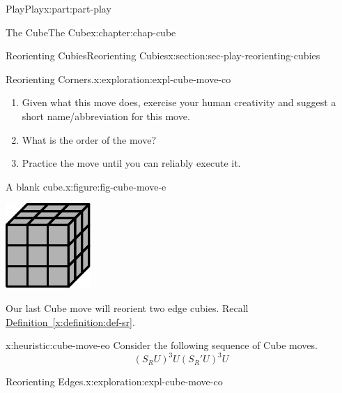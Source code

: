 \documentclass[oneside,10pt,]{book}
\newcommand{\xreffont}{\relax}
\numberwithin{equation}{section}
\begin{document}
\begin{partptx}{Play}{}{Play}{}{}{x:part:part-play}
\begin{chapterptx}{The Cube}{}{The Cube}{}{}{x:chapter:chap-cube}
\begin{sectionptx}{Reorienting Cubies}{}{Reorienting Cubies}{}{}{x:section:sec-play-reorienting-cubies}
\begin{exploration}{Reorienting Corners.}{x:exploration:expl-cube-move-co}
\begin{enumerate}
\item{}Given what this move does, exercise your human creativity and suggest a short name\slash{}abbreviation for this move.%
\item{}What is the order of the move?%
\item{}Practice the move until you can reliably execute it.%
\end{enumerate}
\begin{figureptx}{A blank cube.}{x:figure:fig-cube-move-e}{}%
\begin{image}{0.25}{0.5}{0.25}%
\includegraphics[width=\linewidth]{./images/grey_cube.pdf}
\end{image}%
\tcblower
\end{figureptx}%
\end{exploration}%
Our last Cube move will reorient two edge cubies. Recall \hyperref[x:definition:def-sr]{Definition~{\xreffont\ref{x:definition:def-sr}}}.%
\begin{heuristic}{}{}{x:heuristic:cube-move-eo}%
%
Consider the following sequence of Cube moves.%
%
\begin{equation*}
(S_R U)^3 U (S_R ' U)^3 U
\end{equation*}
\end{heuristic}
\begin{exploration}{Reorienting Edges.}{x:exploration:expl-cube-move-co}%

\end{exploration}
\end{sectionptx}
\end{chapterptx}
\end{partptx}
\end{document}
